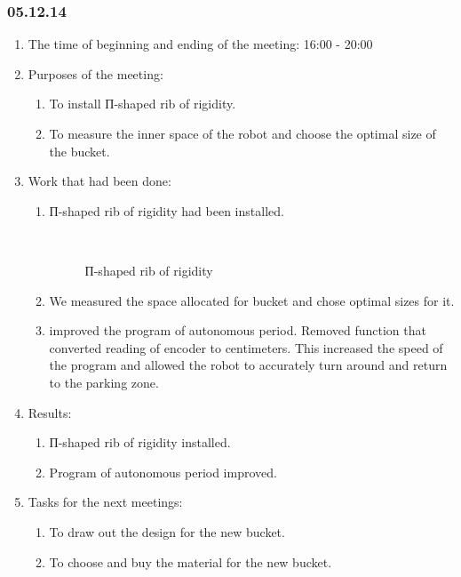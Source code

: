 \subsubsection{05.12.14}

\begin{enumerate}
	\item The time of beginning and ending of the meeting:
	16:00 - 20:00
	\item Purposes of the meeting:
	\begin{enumerate}
	  \item To install П-shaped rib of rigidity.
	  
	  \item To measure the inner space of the robot and choose the optimal size of the bucket.
	  
    \end{enumerate}
	\item Work that had been done:
	\begin{enumerate}
	  \item П-shaped rib of rigidity had been installed.
	  
	  \begin{figure}[H]
	  	\begin{minipage}[h]{0.2\linewidth}
	  		\center  
	  	\end{minipage}
	  	\begin{minipage}[h]{0.6\linewidth}
	  		\caption{П-shaped rib of rigidity}
	  	\end{minipage}
	  \end{figure}
	  
	  \item We measured the space allocated for bucket and chose optimal sizes for it.
	  
	  \item improved the program of autonomous period. Removed function that converted reading of encoder to centimeters. This increased the speed of the program and allowed the robot to accurately turn around and return to the parking zone.	  
	  
    \end{enumerate}
    
	\item Results:  
	\begin{enumerate}
	  \item П-shaped rib of rigidity installed.
	  
	  \item Program of autonomous period improved.
	  
    \end{enumerate}
    
	\item Tasks for the next meetings:
	\begin{enumerate}
	  \item To draw out the design for the new bucket.
	  
	  \item To choose and buy the material for the new bucket.
	  
    \end{enumerate}     
\end{enumerate}
\fillpage
